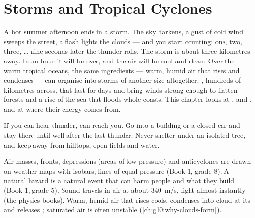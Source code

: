 \chapter{Storms and Tropical Cyclones}\label{ch:g10:storms-and-cyclones}

A hot summer afternoon ends in a storm. The sky darkens, a gust of cold wind
sweeps the street, a flash lights the clouds --- and you start counting:
one, two, three, \ldots{} nine seconds later the thunder rolls. The storm is
about three kilometres away. In an hour it will be over, and the air will be
cool and clean. Over the warm tropical oceans, the same ingredients ---
warm, humid air that rises and condenses --- can organise into storms of
another size altogether: , hundreds of kilometres across,
that last for days and bring winds strong enough to flatten forests and a
rise of the sea that floods whole coasts. This chapter looks at
,  and , and at where their energy
comes from.

\begin{safety}
If you can hear thunder,  can reach you. Go into a building or a
closed car and stay there until well after the last thunder. Never shelter
under an isolated tree, and keep away from hilltops, open fields and water.
\end{safety}

\begin{recall}
Air masses, fronts, depressions (areas of low pressure) and anticyclones
are drawn on weather maps with isobars, lines of equal pressure (Book 1,
grade 8). A natural hazard is a natural event that can harm people and
what they build (Book 1, grade 5). Sound travels in air at about
\qty{340}{m/s}, light almost instantly (the physics books). Warm, humid air
that rises cools, condenses into cloud at its  and
releases ; saturated air is often unstable
(\cref{ch:g10:why-clouds-form}).
\end{recall}

